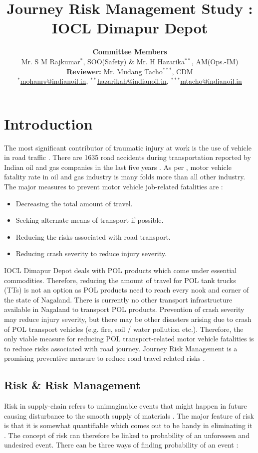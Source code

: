 \documentclass[paper=letter, fontsize=12pt]{article}
\title{\vspace{-15mm}\fontsize{24pt}{10pt}\selectfont\textbf{Journey Risk Management Study : IOCL Dimapur Depot}} %
\author{
\large
{{\textbf{Committee Members} }}\\
{{Mr. S M Rajkumar$^*$, SOO(Safety) \& Mr. H Hazarika$^{**}$, AM(Ops.-IM)}}\\
{{\textbf{Reviewer:} Mr. Mudang Tacho$^{***}$, CDM}}\\
\normalsize \href{mailto:mohanrs@indianoil.in}{$^*$mohanrs@indianoil.in}, \href{mailto:hazarikah@indianoil.in}{$^{**}$hazarikah@indianoil.in}, \href{mailto:mtacho@indianoil.in}{$^{***}$mtacho@indianoil.in}\\[2mm] %
}
\date{}
\begin{document}
\maketitle %
\thispagestyle{fancy} %


\tableofcontents

\section{Introduction}

The most significant contributor of traumatic injury at work is the use of vehicle in road traffic \cite{aus}. There are 1635 road accidents during transportation reported by Indian  oil and gas companies in the last five years \cite{accident}. As per \cite{retzer1}, motor vehicle fatality rate in oil and gas industry is many folds more than all other industry. The major measures to prevent motor vehicle job-related fatalities are \cite{retzer1}:

\begin{itemize}
    \item Decreasing the total amount of travel.
    \item Seeking alternate means of transport if possible.
    \item Reducing the risks associated with road transport.
    \item Reducing crash severity to reduce injury severity.
\end{itemize}

IOCL Dimapur Depot deals with POL products which come under essential commodities. Therefore, reducing the amount of travel for POL tank trucks (TTs) is not an option as POL products need to reach every nook and corner of the state of Nagaland. There is currently no other transport infrastructure available in Nagaland to transport POL products. Prevention of crash severity may reduce injury severity, but there may be other disasters arising due to crash of POL transport vehicles (e.g. fire, soil / water pollution etc.). Therefore, the only viable measure for reducing POL transport-related motor vehicle fatalities is to reduce risks associated with road journey. Journey Risk Management is a promising preventive measure to reduce road travel related risks \cite{retzer1}.



\subsection{Risk \& Risk Management}
Risk in supply-chain refers to unimaginable events that might happen in future causing disturbance to the smooth supply of materials \cite{waters}. The major feature of risk is that it is somewhat quantifiable which comes out to be handy in eliminating it \cite{waters}. The concept of risk can therefore be linked to probability of an unforeseen and undesired event. There can be three ways of finding probability of an event \cite{waters}:
\end{document}

